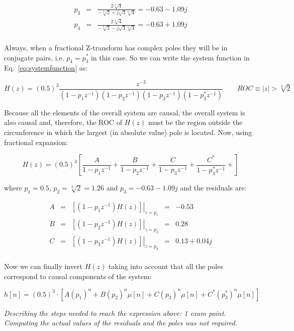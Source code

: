 \documentclass[a4paper,11pt,oneside]{article}
\begin{document}
\[
\begin{array}{lllll}
p_3&=& \frac{2\sqrt[3]{4}}{-\sqrt[3]{2}+ j\sqrt{3}\sqrt[6]{4}}=-0.63-1.09j\\
p_4&=& \frac{2\sqrt[3]{4}}{-\sqrt[3]{2}- j\sqrt{3}\sqrt[6]{4}}=-0.63+1.09j\\
\end{array}
\]

Always, when a fractional Z-transform has complex poles they will be in conjugate pairs, i.e. $p_4=p_3^*$ in this case. So we can write the system function in Eq.~\ref{eq:systemfunction} as:

\[
H(z)=(0.5)^3\frac{z^{-3}}{(1-p_1z^{-1})(1-p_2z^{-1})(1-p_3z^{-1})(1-p_3^*z^{-1})} \qquad ROC \equiv |z|>\sqrt[3]{2}
\]

Because all the elements of the overall system are causal, the overall system is also causal and, therefore, the ROC of $H(z)$ must be the region outside the circunference in which the largest (in absolute value) pole is located. Now, using fractional expansion:

\[
H(z) = (0.5)^3 \left[\frac{A}{1-p_1z^{-1}}+\frac{B}{1-p_2z^{-1}}+\frac{C}{1-p_3z^{-1}}+\frac{C^*}{1-p_3^*z^{-1}}+\right]
\]

where $p_1=0.5$, $p_2=\sqrt[3]{2}=1.26$ and $p_3=-0.63-1.09j$ and the residuals are:

\begin{equation}
\begin{array}{lllll}
A &=& \left.\left[(1-p_1z^{-1})H(z)\right]\right|_{z=p_1}&=&-0.53\\
B &=& \left.\left[(1-p_2z^{-1})H(z)\right]\right|_{z=p_2}&=&0.28\\
C &=& \left.\left[(1-p_3z^{-1})H(z)\right]\right|_{z=p_3}&=&0.13+0.04j\\
\end{array}
\end{equation}

Now we can finally invert $H(z)$ taking into account that all the poles correspond to causal components of the system:

\begin{equation}\label{impulse}
h[n] = (0.5)^3\cdot\left[A(p_1)^n+B(p_2)^n\mu[n]+C(p_3)^n\mu[n]+C^*(p_3^*)^n\mu[n]\right]
\end{equation}

\emph{Describing the steps needed to reach the expression above: 1 exam point. Computing the actual values of the residuals and the poles was not required.}
\end{document}

